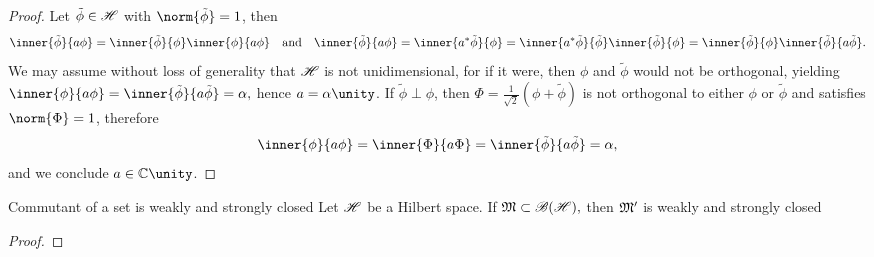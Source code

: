 \begin{proof}
    Let \(\tilde{\phi} \in \mathscr{H}\) with \(\norm{\tilde{\phi}}=1\), then
    \begin{equation*}
        \inner{\tilde{\phi}}{a\phi} = \inner{\tilde{\phi}}{\phi}\inner{\phi}{a\phi}
        \quad\text{and}\quad
        \inner{\tilde{\phi}}{a\phi} = \inner{a^*\tilde{\phi}}{\phi} = \inner{a^*\tilde{\phi}}{\tilde{\phi}}\inner{\tilde{\phi}}{\phi} = \inner{\tilde{\phi}}{\phi} \inner{\tilde{\phi}}{a \tilde{\phi}}.
    \end{equation*}
    We may assume without loss of generality that \(\mathscr{H}\) is not unidimensional, for if it were, then \(\phi\) and \(\tilde{\phi}\) would not be orthogonal, yielding \(\inner{\phi}{a\phi} = \inner{\tilde{\phi}}{a\tilde{\phi}} = \alpha,\) hence \(a = \alpha \unity\). If \(\tilde{\phi} \perp \phi\), then \(\Phi = \frac{1}{\sqrt{2}}(\phi + \tilde{\phi})\) is not orthogonal to either \(\phi\) or \(\tilde{\phi}\) and satisfies \(\norm{\Phi} = 1\), therefore
    \begin{equation*}
        \inner{\phi}{a\phi} = \inner{\Phi}{a\Phi} = \inner{\tilde{\phi}}{a\tilde{\phi}} = \alpha,
    \end{equation*}
    and we conclude \(a \in \mathbb{C} \unity\).
\end{proof}

\begin{proposition}{Commutant of a set is weakly and strongly closed}{}
    Let \(\mathscr{H}\) be a Hilbert space. If \(\mathfrak{M} \subset \mathscr{B}(\mathscr{H}),\) then \(\mathfrak{M}'\) is weakly and strongly closed
\end{proposition}
\begin{proof}
\end{proof}


